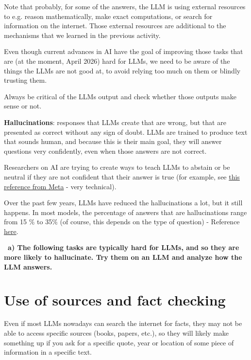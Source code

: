 \documentclass[12pt]{article}
\newcounter{exercise}
\newcommand{\exercisetitle}[2][]{%
  \refstepcounter{exercise}%
  \vspace{0.5cm}%
  \colorbox{maincolor}{%
    \makebox[\dimexpr\linewidth-2\fboxsep][l]{%
      \textcolor{white}{\faPen\ Assignment \theexercise:~ #2}%
    }%
  }%
  \if\relax\detokenize{#1}\relax\else\label{#1}\fi
  \vspace{0.3cm}%
}
\newcounter{question}
\begin{document}
Note that probably, for some of the answers, the LLM is using external resources to e.g. reason mathematically, make exact computations, or search for information on the internet. Those external resources are additional to the mechanisms that we learned in the previous activity.

Even though current advances in AI have the goal of improving those tasks that are (at the moment, April 2026) hard for LLMs, we need to be aware of the things the LLMs are not good at, to avoid relying too much on them or blindly trusting them. 

\begin{importantbox}
    Always be critical of the LLMs output and check whether those outputs make sense or not.
\end{importantbox}

\exercisetitle{Challenge the LLM}

\begin{importantbox}
    \textbf{Hallucinations}: responses that LLMs create that are wrong, but that are presented as correct without any sign of doubt. LLMs are trained to produce text that sounds human, and because this is their main goal, they will answer questions very confidently, even when those answers are not correct.
\end{importantbox}

Researchers on AI are trying to create ways to teach LLMs to abstain or be neutral if they are not confident that their answer is true (for example, see \href{https://arxiv.org/abs/2509.25760}{this reference from Meta} - very technical).

Over the past few years, LLMs have reduced the hallucinations a lot, but it still happens. In most models, the percentage of answers that are hallucinations range from 15 $\%$ to 35$\%$ (of course, this depends on the type of question) - Reference \href{https://research.aimultiple.com/ai-hallucination/}{here}.


\vspace{0.3cm}
\textcolor{maincolor}{\textbf{\faPen\ a) The following tasks are typically hard for LLMs, and so they are more likely to hallucinate. Try them on an LLM and analyze how the LLM answers.}} 

\section*{Use of sources and fact checking}

Even if most LLMs nowadays can search the internet for facts, they may not be able to access specific sources (books, papers, etc.), so they will likely make something up if you ask for a specific quote, year or location of some piece of information in a specific text.
\end{document}

